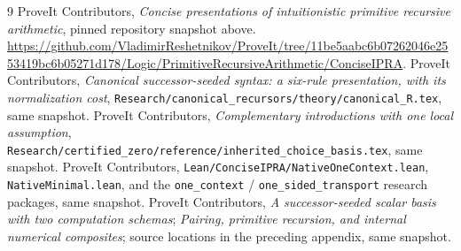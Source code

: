 \documentclass[11pt,letterpaper]{article}
\theoremstyle{definition}\newtheorem{definition}[theorem]{Definition}
\newcommand{\file}[1]{\texttt{\small\nolinkurl{#1}}}
\begin{document}
\begin{thebibliography}{9}
 ProveIt Contributors, \emph{Concise presentations of intuitionistic primitive recursive arithmetic}, pinned repository snapshot above. \url{https://github.com/VladimirReshetnikov/ProveIt/tree/11be5aabc6b07262046e2553419bc6b05271d178/Logic/PrimitiveRecursiveArithmetic/ConciseIPRA}.
 ProveIt Contributors, \emph{Canonical successor-seeded syntax: a six-rule presentation, with its normalization cost}, \file{Research/canonical_recursors/theory/canonical_R.tex}, same snapshot.
 ProveIt Contributors, \emph{Complementary introductions with one local assumption}, \file{Research/certified_zero/reference/inherited_choice_basis.tex}, same snapshot.
 ProveIt Contributors, \file{Lean/ConciseIPRA/NativeOneContext.lean}, \file{NativeMinimal.lean}, and the \file{one_context} / \file{one_sided_transport} research packages, same snapshot.
 ProveIt Contributors, \emph{A successor-seeded scalar basis with two computation schemas}; \emph{Pairing, primitive recursion, and internal numerical composites}; source locations in the preceding appendix, same snapshot.
\end{thebibliography}
\endgroup
\end{document}
